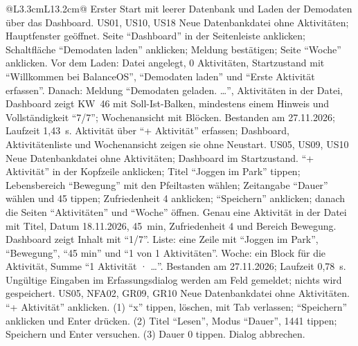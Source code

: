 \begingroup
\begin{longtable}{@{}L{3.3cm}L{13.2cm}@{}}
    {Erster Start mit leerer Datenbank und Laden der Demodaten über das Dashboard.}
    {US01, US10, US18}
    {}
    {Neue Datenbankdatei ohne Aktivitäten; Hauptfenster geöffnet.}
    {Seite \enquote{Dashboard} in der Seitenleiste anklicken; Schaltfläche \enquote{Demodaten laden} anklicken; Meldung bestätigen; Seite \enquote{Woche} anklicken.}
    {Vor dem Laden: Datei angelegt, 0 Aktivitäten, Startzustand mit \enquote{Willkommen bei BalanceOS}, \enquote{Demodaten laden} und \enquote{Erste Aktivität erfassen}. Danach: Meldung \enquote{Demodaten geladen. \dots}, Aktivitäten in der Datei, Dashboard zeigt KW~46 mit Soll-Ist-Balken, mindestens einem Hinweis und Vollständigkeit \enquote{7/7}; Wochenansicht mit Blöcken.}
    {Bestanden am 27.11.2026; Laufzeit 1,43~s.}
  \midrule
    {Aktivität über \enquote{+ Aktivität} erfassen; Dashboard, Aktivitätenliste und Wochenansicht zeigen sie ohne Neustart.}
    {US05, US09, US10}
    {}
    {Neue Datenbankdatei ohne Aktivitäten; Dashboard im Startzustand.}
    {\enquote{+ Aktivität} in der Kopfzeile anklicken; Titel \enquote{Joggen im Park} tippen; Lebensbereich \enquote{Bewegung} mit den Pfeiltasten wählen; Zeitangabe \enquote{Dauer} wählen und 45 tippen; Zufriedenheit 4 anklicken; \enquote{Speichern} anklicken; danach die Seiten \enquote{Aktivitäten} und \enquote{Woche} öffnen.}
    {Genau eine Aktivität in der Datei mit Titel, Datum 18.11.2026, 45~min, Zufriedenheit 4 und Bereich Bewegung. Dashboard zeigt Inhalt mit \enquote{1/7}. Liste: eine Zeile mit \enquote{Joggen im Park}, \enquote{Bewegung}, \enquote{45 min} und \enquote{1 von 1 Aktivitäten}. Woche: ein Block für die Aktivität, Summe \enquote{1 Aktivität · \dots}.}
    {Bestanden am 27.11.2026; Laufzeit 0,78~s.}
  \midrule
    {Ungültige Eingaben im Erfassungsdialog werden am Feld gemeldet; nichts wird gespeichert.}
    {US05, NFA02, GR09, GR10}
    {}
    {Neue Datenbankdatei ohne Aktivitäten.}
    {\enquote{+ Aktivität} anklicken. (1) \enquote{x} tippen, löschen, mit Tab verlassen; \enquote{Speichern} anklicken und Enter drücken. (2) Titel \enquote{Lesen}, Modus \enquote{Dauer}, 1441 tippen; Speichern und Enter versuchen. (3) Dauer 0 tippen. Dialog abbrechen.}

\end{longtable}
